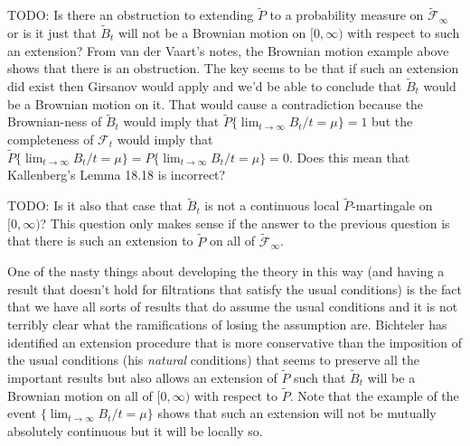 TODO: Is there an obstruction to extending $\tilde{P}$ to a probability measure on $\tilde{\mathcal{F}}_\infty$ or is it just that $\tilde{B}_t$ will not be a Brownian motion on $[0,\infty)$ with respect to such an extension?  From van der Vaart's notes, the Brownian motion example above shows that there is an obstruction.  The key seems to be that if such an extension did exist then Girsanov would apply and we'd be able to conclude that $\tilde{B}_t$ would be a Brownian motion on it.  That would cause a contradiction because the Brownian-ness of $\tilde{B}_t$ would imply that $\tilde{P}\lbrace \lim_{t \to \infty} B_t/t = \mu \rbrace = 1$ but the completeness of $\mathcal{F}_t$ would imply that $\tilde{P}\lbrace \lim_{t \to \infty} B_t/t = \mu \rbrace = P\lbrace \lim_{t \to \infty} B_t/t = \mu \rbrace = 0$.  Does this mean that Kallenberg's Lemma 18.18 is incorrect?

TODO: Is it also that case that $\tilde{B}_t$ is not a continuous local $\tilde{P}$-martingale on $[0,\infty)$?  This question only makes sense if the answer to the previous question is that there is such an extension to $\tilde{P}$ on all of $\tilde{\mathcal{F}}_\infty$.

One of the nasty things about developing the theory in this way (and having a result that doesn't hold for filtrations that satisfy the usual conditions) is the fact that we have all sorts of results that do assume the usual conditions and it is not terribly clear what the ramifications of losing the assumption are.  Bichteler has identified an extension procedure that is more conservative than the imposition of the usual conditions (his \emph{natural} conditions) that seems to preserve all the important results but also allows an extension of $\tilde{P}$ such that $\tilde{B}_t$ will be a Brownian motion on all of $[0,\infty)$ with respect to $\tilde{P}$.  Note that the example of the event $\lbrace \lim_{t \to \infty} B_t/t = \mu \rbrace$ shows that such an extension will not be mutually absolutely continuous but it will be locally so.

